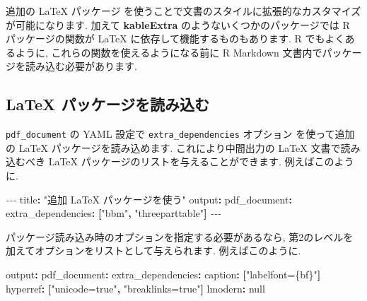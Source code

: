 \documentclass[
  11pt,
  lualatex,
  ja=standard]{bxjsreport}
\newenvironment{Shaded}{\begin{snugshade}}{\end{snugshade}}
\newcommand{\AttributeTok}[1]{\textcolor[rgb]{0.77,0.63,0.00}{#1}}
\newcommand{\CharTok}[1]{\textcolor[rgb]{0.31,0.60,0.02}{#1}}
\newcommand{\FunctionTok}[1]{\textcolor[rgb]{0.00,0.00,0.00}{#1}}
\newcommand{\KeywordTok}[1]{\textcolor[rgb]{0.13,0.29,0.53}{\textbf{#1}}}
\newcommand{\PreprocessorTok}[1]{\textcolor[rgb]{0.56,0.35,0.01}{\textit{#1}}}
\newcommand{\StringTok}[1]{\textcolor[rgb]{0.31,0.60,0.02}{#1}}
\begin{document}
追加の LaTeX パッケージ を使うことで文書のスタイルに拡張的なカスタマイズが可能になります. 加えて \textbf{kableExtra} \autocite{R-kableExtra} のようないくつかのパッケージでは R パッケージの関数が LaTeX に依存して機能するものもあります. R でもよくあるように, これらの関数を使えるようになる前に R Markdown 文書内でパッケージを読み込む必要があります.

\hypertarget{loading-latex-packages}{%
\subsection{LaTeX パッケージを読み込む}\label{loading-latex-packages}}

\texttt{pdf\_document} の YAML 設定で \texttt{extra\_dependencies} オプション を使って追加の LaTeX パッケージを読み込めます. これにより中間出力の LaTeX 文書で読み込むべき LaTeX パッケージのリストを与えることができます. 例えばこのように.

\begin{Shaded}
\begin{Highlighting}[]
\PreprocessorTok{{-}{-}{-}}
\FunctionTok{title}\KeywordTok{:}\AttributeTok{ }\StringTok{"追加 LaTeX パッケージを使う"}
\FunctionTok{output}\KeywordTok{:}
\AttributeTok{  }\FunctionTok{pdf\_document}\KeywordTok{:}
\AttributeTok{    }\FunctionTok{extra\_dependencies}\KeywordTok{:}\AttributeTok{ }\KeywordTok{[}\StringTok{"bbm"}\KeywordTok{,}\AttributeTok{ }\StringTok{"threeparttable"}\KeywordTok{]}
\PreprocessorTok{{-}{-}{-}}
\end{Highlighting}
\end{Shaded}

パッケージ読み込み時のオプションを指定する必要があるなら, 第2のレベルを加えてオプションをリストとして与えられます. 例えばこのように.

\begin{Shaded}
\begin{Highlighting}[]
\FunctionTok{output}\KeywordTok{:}\AttributeTok{ }
\AttributeTok{  }\FunctionTok{pdf\_document}\KeywordTok{:}
\AttributeTok{    }\FunctionTok{extra\_dependencies}\KeywordTok{:}
\AttributeTok{      }\FunctionTok{caption}\KeywordTok{:}\AttributeTok{ }\KeywordTok{[}\StringTok{"labelfont=\{bf\}"}\KeywordTok{]}
\AttributeTok{      }\FunctionTok{hyperref}\KeywordTok{:}\AttributeTok{ }\KeywordTok{[}\StringTok{"unicode=true"}\KeywordTok{,}\AttributeTok{ }\StringTok{"breaklinks=true"}\KeywordTok{]}
\AttributeTok{      }\FunctionTok{lmodern}\KeywordTok{:}\AttributeTok{ }\CharTok{null}
\end{Highlighting}
\end{Shaded}
\end{document}
